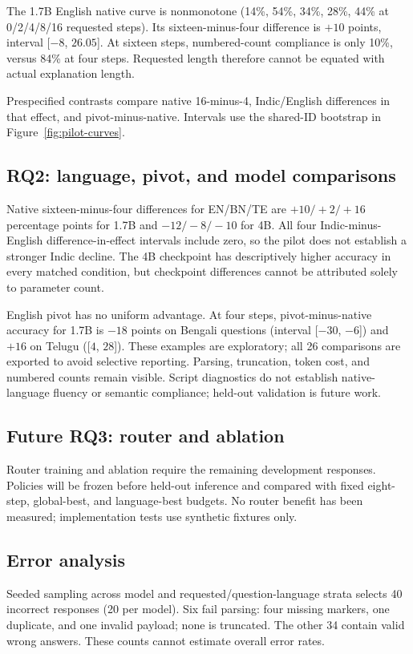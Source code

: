 \documentclass[11pt]{article}
\begin{document}
The 1.7B English native curve is nonmonotone (14\%, 54\%, 34\%, 28\%, 44\% at 0/2/4/8/16 requested steps). Its sixteen-minus-four difference is $+10$ points, interval [$-8$, $26.05$]. At sixteen steps, numbered-count compliance is only 10\%, versus 84\% at four steps. Requested length therefore cannot be equated with actual explanation length.

Prespecified contrasts compare native 16-minus-4, Indic/English differences in that effect, and pivot-minus-native. Intervals use the shared-ID bootstrap in Figure~\ref{fig:pilot-curves}.

\subsection{RQ2: language, pivot, and model comparisons}
Native sixteen-minus-four differences for EN/BN/TE are $+10/+2/+16$ percentage points for 1.7B and $-12/-8/-10$ for 4B. All four Indic-minus-English difference-in-effect intervals include zero, so the pilot does not establish a stronger Indic decline. The 4B checkpoint has descriptively higher accuracy in every matched condition, but checkpoint differences cannot be attributed solely to parameter count.

English pivot has no uniform advantage. At four steps, pivot-minus-native accuracy for 1.7B is $-18$ points on Bengali questions (interval [$-30$, $-6$]) and $+16$ on Telugu ([$4$, $28$]). These examples are exploratory; all 26 comparisons are exported to avoid selective reporting. Parsing, truncation, token cost, and numbered counts remain visible. Script diagnostics do not establish native-language fluency or semantic compliance; held-out validation is future work.

\subsection{Future RQ3: router and ablation}
Router training and ablation require the remaining development responses. Policies will be frozen before held-out inference and compared with fixed eight-step, global-best, and language-best budgets. No router benefit has been measured; implementation tests use synthetic fixtures only.

\subsection{Error analysis}
Seeded sampling across model and requested/question-language strata selects 40 incorrect responses (20 per model). Six fail parsing: four missing markers, one duplicate, and one invalid payload; none is truncated. The other 34 contain valid wrong answers. These counts cannot estimate overall error rates.
\end{document}
